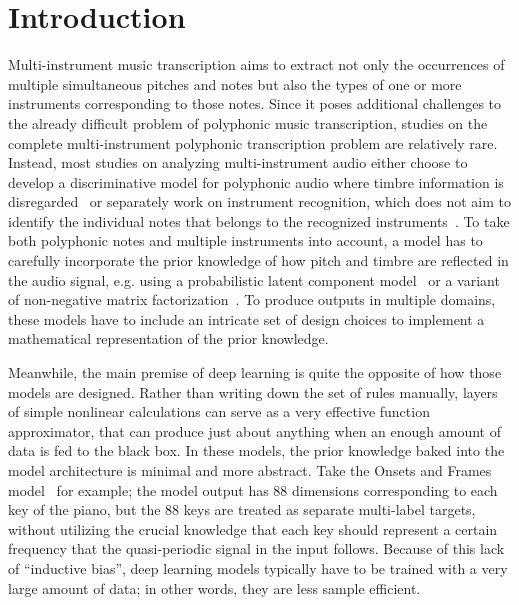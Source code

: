 \section{Introduction}

Multi-instrument music transcription aims to extract not only the occurrences of multiple simultaneous pitches and notes but also the types of one or more instruments corresponding to those notes.
Since it poses additional challenges to the already difficult problem of polyphonic music transcription, studies on the complete multi-instrument polyphonic transcription problem are relatively rare.
Instead, most studies on analyzing multi-instrument audio either choose to develop a discriminative model for polyphonic audio where timbre information is disregarded~\cite{bittner2017deepsalience,zhang2018particle}
or separately work on instrument recognition, which does not aim to identify the individual notes that belongs to the recognized instruments~\cite{agostini2003timbres,lostanlen2016spiral}.
To take both polyphonic notes and multiple instruments into account, a model has to carefully incorporate the prior knowledge of how pitch and timbre are reflected in the audio signal, e.g. using a probabilistic latent component model~\cite{benetos2015probabilistic} or a variant of non-negative matrix factorization~\cite{grindlay2009eigeninstruments}.
To produce outputs in multiple domains, these models have to include an intricate set of design choices to implement a mathematical representation of the prior knowledge.

Meanwhile, the main premise of deep learning is quite the opposite of how those models are designed.
Rather than writing down the set of rules manually, layers of simple nonlinear calculations can serve as a very effective function approximator, that can produce just about anything when an enough amount of data is fed to the black box.
In these models, the prior knowledge baked into the model architecture is minimal and more abstract.
Take the Onsets and Frames model~\cite{hawthorne2018onsetsframes} for example; the model output has 88 dimensions corresponding to each key of the piano, but the 88 keys are treated as separate multi-label targets, without utilizing the crucial knowledge that each key should represent a certain frequency that the quasi-periodic signal in the input follows.
Because of this lack of ``inductive bias'', deep learning models typically have to be trained with a very large amount of data; in other words, they are less sample efficient.


